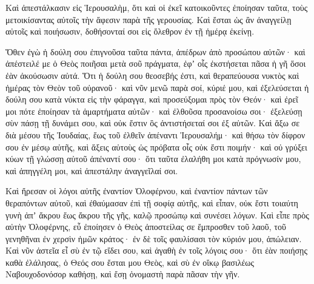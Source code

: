 {Καὶ ἀπεστάλκασιν εἰς Ἱερουσαλὴμ, ὅτι καὶ οἱ ἐκεῖ κατοικοῦντες ἐποίησαν ταῦτα, τοὺς μετοικίσαντας αὐτοῖς τὴν ἄφεσιν παρὰ τῆς γερουσίας.
Καὶ ἔσται ὡς ἂν ἀναγγείλῃ αὐτοῖς καὶ ποιήσωσιν, δοθήσονταί σοι εἰς ὄλεθρον ἐν τῇ ἡμέρᾳ ἐκείνῃ.
\par }{\PP {}Ὅθεν ἐγὼ ἡ δούλη σου ἐπιγνοῦσα ταῦτα πάντα, ἀπέδρων ἀπὸ προσώπου αὐτῶν· καὶ ἀπέστειλέ με ὁ Θεὸς ποιῆσαι μετὰ σοῦ πράγματα, ἐφʼ οἷς ἐκστήσεται πᾶσα ἡ γῆ ὅσοι ἐὰν ἀκούσωσιν αὐτά.
Ὅτι ἡ δούλη σου θεοσεβής ἐστι, καὶ θεραπεύουσα νυκτὸς καὶ ἡμέρας τὸν Θεὸν τοῦ οὐρανοῦ· καὶ νῦν μενῶ παρὰ σοί, κύριέ μου, καὶ ἐξελεύσεται ἡ δούλη σου κατὰ νύκτα εἰς τὴν φάραγγα, καὶ προσεύξομαι πρὸς τὸν Θεόν· καὶ ἐρεῖ μοι πότε ἐποίησαν τὰ ἁμαρτήματα αὐτῶν·
καὶ ἐλθοῦσα προσανοίσω σοι· ἐξελεύσῃ σὺν πάσῃ τῇ δυνάμει σου, καὶ οὐκ ἔστιν ὃς ἀντιστήσεταί σοι ἐξ αὐτῶν.
Καὶ ἄξω σε διὰ μέσου τῆς Ἰουδαίας, ἕως τοῦ ἐλθεῖν ἀπέναντι Ἱερουσαλήμ· καὶ θήσω τὸν δίφρον σου ἐν μέσῳ αὐτῆς, καὶ ἄξεις αὐτοὺς ὡς πρόβατα οἷς οὐκ ἔστι ποιμήν· καὶ οὐ γρύξει κύων τῇ γλώσσῃ αὐτοῦ ἀπέναντί σου· ὅτι ταῦτα ἐλαλήθη μοι κατὰ πρόγνωσίν μου, καὶ ἀπηγγέλη μοι, καὶ ἀπεστάλην ἀναγγεῖλαί σοι.
\par }{\PP {}Καὶ ἤρεσαν οἱ λόγοι αὐτῆς ἐναντίον Ὀλοφέρνου, καὶ ἐναντίον πάντων τῶν θεραπόντων αὐτοῦ, καὶ ἐθαύμασαν ἐπὶ τῇ σοφίᾳ αὐτῆς, καὶ εἶπαν,
οὐκ ἔστι τοιαύτη γυνὴ ἀπʼ ἄκρου ἕως ἄκρου τῆς γῆς, καλῷ προσώπῳ καὶ συνέσει λόγων.
Καὶ εἶπε πρὸς αὐτὴν Ὀλοφέρνης, εὖ ἐποίησεν ὁ Θεὸς ἀποστείλας σε ἔμπροσθεν τοῦ λαοῦ, τοῦ γενηθῆναι ἐν χερσὶν ἡμῶν κράτος· ἐν δὲ τοῖς φαυλίσασι τὸν κύριόν μου, ἀπώλειαν.
Καὶ νῦν ἀστεῖα εἶ σὺ ἐν τῷ εἴδει σου, καὶ ἀγαθὴ ἐν τοῖς λόγοις σου· ὅτι ἐὰν ποιήσῃς καθὰ ἐλάλησας, ὁ Θεός σου ἔσται μου Θεὸς, καὶ σὺ ἐν οἴκῳ βασιλέως Ναβουχοδονόσορ καθήσῃ, καὶ ἔσῃ ὀνομαστὴ παρὰ πᾶσαν τὴν γῆν.

}
